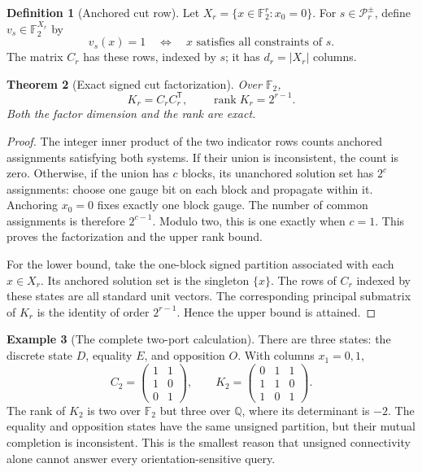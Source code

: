 \documentclass[11pt,letterpaper]{article}
\newtheorem{theorem}{Theorem}[section]
\theoremstyle{definition}
\newtheorem{definition}[theorem]{Definition}
\newtheorem{example}[theorem]{Example}
\newcommand{\F}{\mathbb F}
\newcommand{\Q}{\mathbb Q}
\newcommand{\SP}{\mathcal P_r^{\pm}}
\newcommand{\rank}{\operatorname{rank}}
\begin{document}
\begin{definition}[Anchored cut row]
Let $X_r=\{x\in\F_2^r:x_0=0\}$. For $s\in\SP$, define $v_s\in\F_2^{X_r}$ by
\[
 v_s(x)=1\quad\Longleftrightarrow\quad x\text{ satisfies all constraints of }s.
\]
The matrix $C_r$ has these rows, indexed by $s$; it has $d_r=|X_r|$ columns.
\end{definition}

\begin{theorem}[Exact signed cut factorization]\label{thm:binary-rank}
Over $\F_2$,
\begin{equation}\label{eq:cut-factor}
 K_r=C_r C_r^{\mathsf T},\qquad \rank K_r=2^{r-1}.
\end{equation}
Both the factor dimension and the rank are exact.
\end{theorem}
\begin{proof}
The integer inner product of the two indicator rows counts anchored assignments satisfying both systems. If their union is inconsistent, the count is zero. Otherwise, if the union has $c$ blocks, its unanchored solution set has $2^c$ assignments: choose one gauge bit on each block and propagate within it. Anchoring $x_0=0$ fixes exactly one block gauge. The number of common assignments is therefore $2^{c-1}$. Modulo two, this is one exactly when $c=1$. This proves the factorization and the upper rank bound.

For the lower bound, take the one-block signed partition associated with each $x\in X_r$. Its anchored solution set is the singleton $\{x\}$. The rows of $C_r$ indexed by these states are all standard unit vectors. The corresponding principal submatrix of $K_r$ is the identity of order $2^{r-1}$. Hence the upper bound is attained.
\end{proof}

\begin{example}[The complete two-port calculation]\label{ex:twoports}
There are three states: the discrete state $D$, equality $E$, and opposition $O$. With columns $x_1=0,1$,
\[
 C_2=\begin{pmatrix}1&1\\1&0\\0&1\end{pmatrix},\qquad
 K_2=\begin{pmatrix}0&1&1\\1&1&0\\1&0&1\end{pmatrix}.
\]
The rank of $K_2$ is two over $\F_2$ but three over $\Q$, where its determinant is $-2$. The equality and opposition states have the same unsigned partition, but their mutual completion is inconsistent. This is the smallest reason that unsigned connectivity alone cannot answer every orientation-sensitive query.
\end{example}
\end{document}
